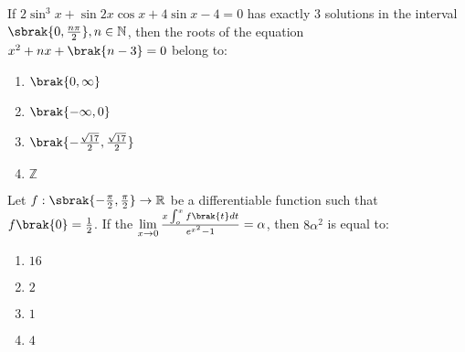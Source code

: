	\item If $2\sin^3x + \sin 2x \cos x + 4\sin x - 4 = 0$ has exactly $3$ solutions in the interval $\sbrak{0,\frac{n\pi}{2}}, n \in \mathbb{N}$, then the roots of the equation $x^2+nx+\brak{n-3}=0$ belong to: \hfill {} 
		\begin{enumerate}
			\item $\brak{0, \infty}$
			\item $\brak{-\infty, 0}$
			\item $\brak{-\frac{\sqrt{17}}{2}, \frac{\sqrt{17}}{2}}$
			\item $\mathbb{Z}$
		\end{enumerate}
	\item Let $f:\sbrak{-\frac{\pi}{2}, \frac{\pi}{2}} \to \mathbb{R}$ be a differentiable function such that $f\brak{0}=\frac{1}{2}$. If the $\lim\limits_{x\to0} \frac{x\int_o^xf\brak{t}dt}{e^{x^2}-1}=\alpha$, then $8\alpha^2$ is equal to: \hfill {} 
		\begin{enumerate}
			\item $16$
			\item $2$
			\item $1$
			\item $4$
		\end{enumerate}
%
